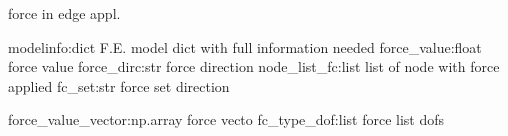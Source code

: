 \documentclass[letterpaper,10pt,english]{sphinxmanual}
\begin{document}

\begin{fulllineitems}
\label{\detokenize{myfempy.felib.physics:myfempy.felib.physics.force2node.force_edge}}
\pysigstartsignatures
{}
\pysigstopsignatures
\sphinxAtStartPar
force in edge appl.
\begin{description}
\sphinxAtStartPar
modelinfo:dict        \textendash{} F.E. model dict with full information needed
force\_value:float     \textendash{} force value
force\_dirc:str        \textendash{} force direction
node\_list\_fc:list     \textendash{} list of node with force applied
fc\_set:str            \textendash{} force set direction

\sphinxAtStartPar
force\_value\_vector:np.array  \textendash{} force vecto
fc\_type\_dof:list             \textendash{} force list dofs

\end{description}

\end{fulllineitems}

\end{document}
